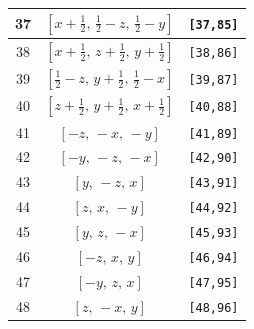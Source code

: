 \documentclass[fleqn,8pt]{jsarticle}
\begin{document}
\begin{longtable}{ccc}
37 & $\left[ x + \frac{1}{2},\, \frac{1}{2} - z,\, \frac{1}{2} - y \right]$ & {\tt [37,85]} \\ \hline
38 & $\left[ x + \frac{1}{2},\, z + \frac{1}{2},\, y + \frac{1}{2} \right]$ & {\tt [38,86]} \\ \hline
39 & $\left[ \frac{1}{2} - z,\, y + \frac{1}{2},\, \frac{1}{2} - x \right]$ & {\tt [39,87]} \\ \hline
40 & $\left[ z + \frac{1}{2},\, y + \frac{1}{2},\, x + \frac{1}{2} \right]$ & {\tt [40,88]} \\ \hline
41 & $\left[ - z,\, - x,\, - y \right]$ & {\tt [41,89]} \\ \hline
42 & $\left[ - y,\, - z,\, - x \right]$ & {\tt [42,90]} \\ \hline
43 & $\left[ y,\, - z,\, x \right]$ & {\tt [43,91]} \\ \hline
44 & $\left[ z,\, x,\, - y \right]$ & {\tt [44,92]} \\ \hline
45 & $\left[ y,\, z,\, - x \right]$ & {\tt [45,93]} \\ \hline
46 & $\left[ - z,\, x,\, y \right]$ & {\tt [46,94]} \\ \hline
47 & $\left[ - y,\, z,\, x \right]$ & {\tt [47,95]} \\ \hline
48 & $\left[ z,\, - x,\, y \right]$ & {\tt [48,96]} \\
\end{longtable}
\end{document}
